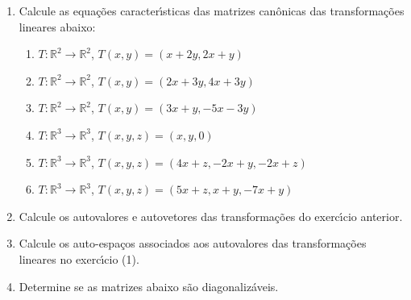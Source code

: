 \documentclass[a4paper,5pt]{amsbook}
\begin{document}
\vspace{1cm}
\begin{enumerate}
	\vspace{0.5cm}
	\item Calcule as equa\c{c}\~oes caracter\'{\i}sticas das matrizes can\^onicas das
		transforma\c{c}\~oes lineares abaixo:
		\begin{enumerate}
			\item $T:\mathbb{R}^2 \rightarrow \mathbb{R}^2$, $T(x,y) = (x+2y, 2x+y)$
			\item $T:\mathbb{R}^2 \rightarrow \mathbb{R}^2$, $T(x,y) = (2x+3y, 4x+3y)$
			\item $T:\mathbb{R}^2 \rightarrow \mathbb{R}^2$, $T(x,y) = (3x+y, -5x-3y)$
			\item $T:\mathbb{R}^3 \rightarrow \mathbb{R}^3$, $T(x,y,z) = (x, y, 0)$
			\item $T:\mathbb{R}^3 \rightarrow \mathbb{R}^3$, $T(x,y,z) = (4x+z, -2x+y, -2x+z)$
			\item $T:\mathbb{R}^3 \rightarrow \mathbb{R}^3$, $T(x,y,z) = (5x+z, x+y, -7x+y)$
		\end{enumerate}

	\vspace{0.5cm}
	\item Calcule os autovalores e autovetores das transforma\c{c}\~oes do exerc\'{\i}cio
		anterior.

	\vspace{0.5cm}
	\item Calcule os auto-espa\c{c}os associados aos autovalores das transforma\c{c}\~oes
		lineares no exerc\'{\i}cio (1).

	\vspace{0.5cm}
	\item Determine se as matrizes abaixo s\~ao diagonaliz\'aveis.


\end{enumerate}
\end{document}
